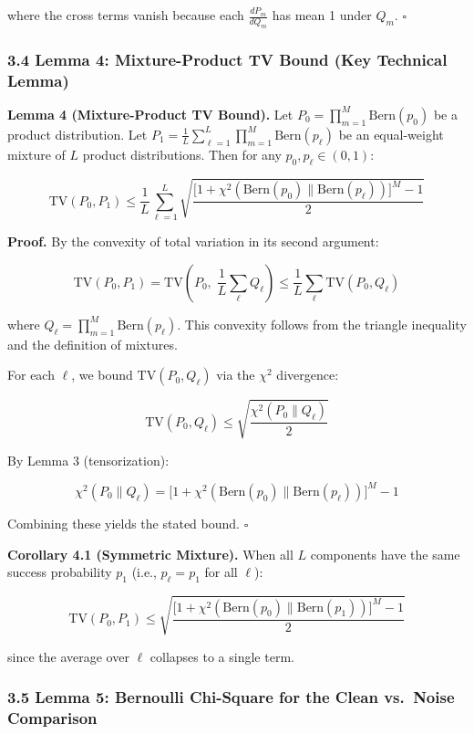 \documentclass[
  12pt,
]{article}
\begin{document}
where the cross terms vanish because each \(\frac{dP_m}{dQ_m}\) has mean
1 under \(Q_m\). \(\square\)

\subsubsection{3.4 Lemma 4: Mixture-Product TV Bound (Key Technical
Lemma)}\label{lemma-4-mixture-product-tv-bound-key-technical-lemma}

\textbf{Lemma 4 (Mixture-Product TV Bound).} Let
\(P_0 = \prod_{m=1}^M \text{Bern}(p_0)\) be a product distribution. Let
\(P_1 = \frac{1}{L} \sum_{\ell=1}^L \prod_{m=1}^M \text{Bern}(p_\ell)\)
be an equal-weight mixture of \(L\) product distributions. Then for any
\(p_0, p_\ell \in (0,1)\):

\[\text{TV}(P_0, P_1) \leq \frac{1}{L} \sum_{\ell=1}^L \sqrt{ \frac{ \bigl[1 + \chi^2(\text{Bern}(p_0) \parallel \text{Bern}(p_\ell))\bigr]^M - 1 }{2} }\]

\textbf{Proof.} By the convexity of total variation in its second
argument:

\[\text{TV}(P_0, P_1) = \text{TV}\!\left(P_0,\; \frac{1}{L}\sum_{\ell} Q_\ell\right) \leq \frac{1}{L}\sum_{\ell} \text{TV}(P_0, Q_\ell)\]

where \(Q_\ell = \prod_{m=1}^M \text{Bern}(p_\ell)\). This convexity
follows from the triangle inequality and the definition of mixtures.

For each \(\ell\), we bound \(\text{TV}(P_0, Q_\ell)\) via the
\(\chi^2\) divergence:

\[\text{TV}(P_0, Q_\ell) \leq \sqrt{\frac{\chi^2(P_0 \parallel Q_\ell)}{2}}\]

By Lemma 3 (tensorization):

\[\chi^2(P_0 \parallel Q_\ell) = \bigl[1 + \chi^2(\text{Bern}(p_0) \parallel \text{Bern}(p_\ell))\bigr]^M - 1\]

Combining these yields the stated bound. \(\square\)

\textbf{Corollary 4.1 (Symmetric Mixture).} When all \(L\) components
have the same success probability \(p_1\) (i.e., \(p_\ell = p_1\) for
all \(\ell\)):

\[\text{TV}(P_0, P_1) \leq \sqrt{ \frac{ \bigl[1 + \chi^2(\text{Bern}(p_0) \parallel \text{Bern}(p_1))\bigr]^M - 1 }{2} }\]

since the average over \(\ell\) collapses to a single term.

\subsubsection{3.5 Lemma 5: Bernoulli Chi-Square for the Clean vs.~Noise
Comparison}\label{lemma-5-bernoulli-chi-square-for-the-clean-vs.-noise-comparison}
\end{document}

